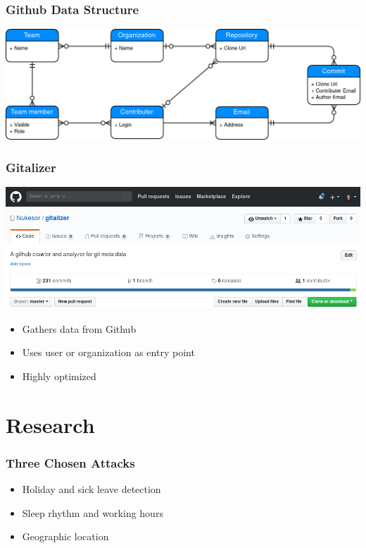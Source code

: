 \documentclass[t]{beamer}
\begin{document}
\begin{frame}
    \frametitle{Github Data Structure}
    \vspace{5mm}
    \begin{center}
        \includegraphics[scale=0.19]{github-data-structure.png}
    \end{center}
\end{frame}

\begin{frame}
    \frametitle{Gitalizer}
    \begin{center}
        \includegraphics[scale=0.30]{./pic/gitalizer-github.png}
    \end{center}

    \begin{itemize}
        \item Gathers data from Github
        \item Uses user or organization as entry point
        \item Highly optimized
    \end{itemize}
\end{frame}

\section{Research}
\begin{frame}
    \frametitle{Three Chosen Attacks}
    \vspace{1cm}
    \begin{itemize}
        \item Holiday and sick leave detection
        \pause{}
        \item Sleep rhythm and working hours
        \pause{}
        \item Geographic location
    \end{itemize}
\end{frame}
\end{document}
